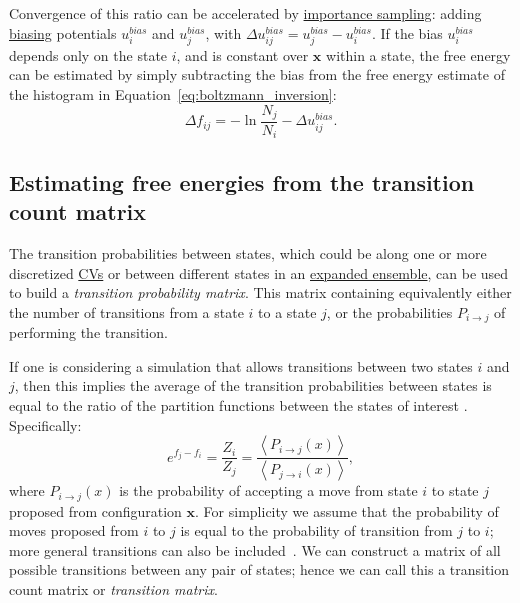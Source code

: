 \documentclass[9pt,review]{livecoms}
\newcommand{\vx}{\mathbf{x}}
\begin{document}
Convergence of this ratio can be accelerated by \hyperlink{ref:IS} {importance sampling}: adding \hyperlink{ref:biasingE} {biasing} potentials $u^{bias}_i$ and $u^{bias}_j$, with $\Delta u^{bias}_{ij}=u^{bias}_j - u^{bias}_i$.
If the bias $u^{bias}_i$ depends only on the state $i$, and is constant over $\vx$ within a state, the free energy can be estimated by simply subtracting the bias from the free energy estimate of the histogram in Equation~\ref{eq:boltzmann_inversion}: \begin{equation}
\Delta f_{ij} = -\ln \frac{N_j}{N_i} - \Delta u^{bias}_{ij}.
\label{eq:boltzmann_inversion_biased}
\end{equation}

\subsection{Estimating free energies from the transition count matrix\label{sec:transition_matrix}}

The transition probabilities between states, which could be along one or more discretized \hyperlink{ref:CV} {CVs} or between different states in an \hyperlink{ref:ExpEns}{expanded ensemble}, can be used to build a \textit{transition probability matrix}. This matrix containing equivalently either the number of transitions from a state $i$ to a state $j$, or the probabilities $P_{i\rightarrow j}$ of performing the transition.

If one is considering a simulation that allows transitions between two states $i$ and $j$, then this implies the average of the transition probabilities between states is equal to the ratio of the partition functions between the states of interest \cite{deOliveira:EPJB:1998,Wang:JoSP:2002,escobedo_transition_2006}. Specifically:
\begin{equation}
e^{f_j-f_i} = \frac{Z_i}{Z_j} = \frac{\left \langle  P_{i\rightarrow j}(x)\right\rangle}{\left \langle P_{j\rightarrow i}(x) \right \rangle},
\end{equation}
where $P_{i\rightarrow j}(x)$ is the probability of accepting a move from state $i$ to state $j$ proposed from configuration $\vx$. For simplicity we assume that the probability of moves proposed from $i$ to $j$ is equal to the probability of transition from $j$ to $i$; more general transitions can also be included~\cite{escobedo_transition_2006}. We can construct a matrix of all possible transitions between any pair of states; hence we can call this a transition count matrix or \textit{transition matrix}.
\end{document}
